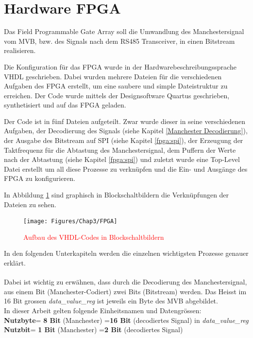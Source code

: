 


\section{Hardware FPGA}
\label{Hardware FPGA}
Das Field Programmable Gate Array soll die Umwandlung des Manchestersignal vom MVB, bzw. des Signals
nach dem RS485 Transceiver, in einen Bitstream realisieren. 

Die Konfiguration für das FPGA wurde in der Hardwarebeschreibungssprache VHDL geschrieben. Dabei wurden
mehrere Dateien für die verschiedenen Aufgaben des FPGA erstellt, um eine saubere und simple 
Dateistruktur zu erreichen. Der Code wurde mittels der Designsoftware Quartus geschrieben,
synthetisiert und auf das FPGA geladen.

Der Code ist in fünf Dateien aufgeteilt. Zwar wurde dieser in seine verschiedenen Aufgaben, der
Decodierung des Signals (siehe Kapitel \ref{Manchester Decodierung}), der Ausgabe des Bitstream auf SPI
(siehe Kapitel \ref{fpga:spi}), der Erzeugung der Taktfrequenz für die Abtastung des Manchestersignal,
dem Puffern der Werte nach der Abtastung (siehe Kapitel \ref{fpga:spi}) und zuletzt wurde eine Top-Level Datei erstellt um all diese
Prozesse zu verknüpfen und die Ein- und Ausgänge des FPGA zu konfigurieren.

In Abbildung \ref{fig:AufbauFPGA} sind graphisch in Blockschaltbildern die Verknüpfungen der Dateien zu sehen.

\begin{figure}[H]
    \centering
    \texttt{[image: Figures/Chap3/FPGA]}
    \caption{\textcolor{red}{Aufbau des VHDL-Codes in Blockschaltbildern}}
    \label{fig:AufbauFPGA}
\end{figure}

In den folgenden Unterkapiteln werden die einzelnen wichtigsten Prozesse genauer erklärt.\\
\\
Dabei ist wichtig zu erwähnen, dass durch die Decodierung des Manchestersignal, aus einem Bit
(Manchester-Codiert) zwei Bits (Bitstream) werden. Das Heisst im 16 Bit grossen 
\textit{data\_value\_reg} ist jeweils ein Byte des MVB abgebildet.\\
\newline
In dieser Arbeit gelten folgende Einheitsnamen und Datengrössen:\\
\textbf{Nutzbyte}\hspace{0.1cm}= \textbf{8 Bit} (Manchester) =\hspace{0.1cm}\textbf{16 Bit} (decodiertes Signal) in \textit{data\_value\_reg}\\
\textbf{Nutzbit}\hspace{0.37cm}= \textbf{1 Bit} (Manchester) =\hspace{0.3cm}\textbf{2  Bit} (decodiertes Signal)
\newpage
